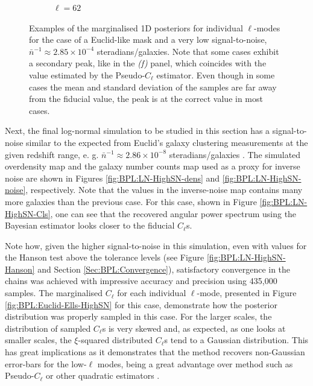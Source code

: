 \begin{figure}
\begin{subfigure}{.5\textwidth}
  \caption{$\ell = 62$}
\end{subfigure}
\caption[Examples of marginalised 1D posteriors for individual $\ell$-modes for the case of a Euclid-like mask and a very low signal-to-noise.]{Examples of the marginalised 1D posteriors for individual $\ell$-modes for the case of a Euclid-like mask and a very low signal-to-noise, $\bar{n}^{-1}\approx 2.85\times 10^{-4}$ steradians/galaxies. Note that some cases exhibit a secondary peak, like in the \textit{(f)} panel, which coincides with the value estimated by the Pseudo-$C_{\ell}$ estimator. Even though in some cases the mean and standard deviation of the samples are far away from the fiducial value, the peak is at the correct value in most cases.}
\label{fig:BPL:Euclid-Ells}
\end{figure}

\qquad Next, the final log-normal simulation to be studied in this section has a signal-to-noise similar to the expected from Euclid's galaxy clustering measurements at the given redshift range, e. g. $\bar{n}^{-1}\approx 2.86\times 10^{-8}$ steradians/galaxies \citep{2011EuclidRedPaper}. The simulated overdensity map and the galaxy number counts map used as a proxy for inverse noise are shown in Figures \ref{fig:BPL:LN-HighSN-dens} and \ref{fig:BPL:LN-HighSN-noise}, respectively. Note that the values in the inverse-noise map contains many more galaxies than the previous case. For this case, shown in Figure \ref{fig:BPL:LN-HighSN-Cls}, one can see that the recovered angular power spectrum using the Bayesian estimator looks closer to the fiducial $C_{\ell}$s. 

\qquad Note how, given the higher signal-to-noise in this simulation, even with values for the Hanson test above the tolerance levels (see Figure \ref{fig:BPL:LN-HighSN-Hanson} and Section \ref{Sec:BPL:Convergence}), satisfactory convergence in the chains was achieved with impressive accuracy and precision using 435,000 samples. The marginalised $C_{\ell}$ for each individual $\ell$-mode, presented in Figure \ref{fig:BPL:Euclid-Ells-HighSN} for this case, demonstrate how the posterior distribution was properly sampled in this case. For the larger scales, the distribution of sampled $C_{\ell}$s is very skewed and, as expected, as one looks at smaller scales, the $\xi$-squared distributed $C_{\ell}$s tend to a Gaussian distribution. This has great implications as it demonstrates that the method recovers non-Gaussian error-bars for the low-$\ell$ modes, being a great advantage over method such as Pseudo-$C_{\ell}$ or other quadratic estimators \citep{Boris2013}.

